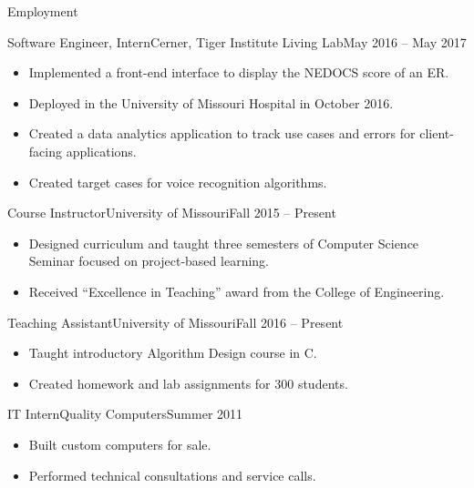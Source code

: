 \documentclass[]{mcdowellcv}
\begin{document}
    \begin{cvsection}{Employment}
        \begin{cvsubsection}{Software Engineer, Intern}{Cerner, Tiger Institute Living Lab}{May 2016 -- May 2017}		
            \begin{itemize}
                \item Implemented a front-end interface to display the NEDOCS score of an ER.
                \item Deployed in the University of Missouri Hospital in October 2016.
                \item Created a data analytics application to track use cases and errors for client-facing applications.
                \item Created target cases for voice recognition algorithms.
            \end{itemize}
        \end{cvsubsection}
        
        \begin{cvsubsection}{Course Instructor}{University of Missouri}{Fall 2015 -- Present}
            \begin{itemize}
                \item Designed curriculum and taught three semesters of Computer Science Seminar focused on project-based learning.
                \item Received “Excellence in Teaching” award from the College of Engineering.
            \end{itemize}
        \end{cvsubsection}
        
        \begin{cvsubsection}{Teaching Assistant}{University of Missouri}{Fall 2016 -- Present}
            \begin{itemize}
                \item Taught introductory Algorithm Design course in C.
                \item Created homework and lab assignments for 300 students.
            \end{itemize}
        \end{cvsubsection}
        
        \begin{cvsubsection}{IT Intern}{Quality Computers}{Summer 2011}	
            \begin{itemize}
                \item Built custom computers for sale.
                \item Performed technical consultations and service calls.
            \end{itemize}
        \end{cvsubsection}
    \end{cvsection}	
    
\end{document}
